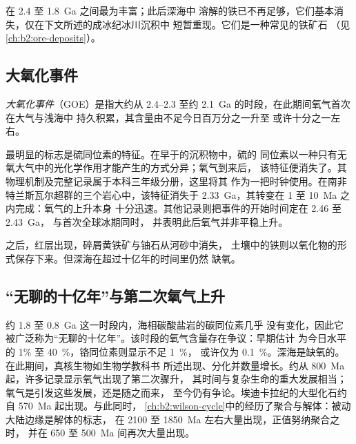 在 2.4 至 \qty{1.8}{Ga} 之间最为丰富；此后深海中
溶解的铁已不再足够，它们基本消失，仅在下文所述的成冰纪冰川沉积中
短暂重现。它们是一种常见的铁矿石
（见\cref{ch:b2:ore-deposits}）。

\subsection*{大氧化事件}

\begin{definition}[大氧化事件]\label{def:b2:precambrian-earth:goe}
\emph{大氧化事件}（GOE）是指大约从 2.4–2.3 至约
\qty{2.1}{Ga} 的时段，在此期间氧气首次在大气与浅海中
持久积累，其含量由不足今日百万分之一升至
或许十分之一左右。
\end{definition}

最明显的标志是硫同位素的特征。在早于的沉积物中，硫的
同位素以一种只有无氧大气中的光化学作用才能产生的方式分异；氧气到来后，
该特征便消失了。其物理机制及完整记录属于本科三年级分册，这里将其
作为一把时钟使用。在南非特兰斯瓦尔超群的三个岩心中，该特征消失于
\qty{2.33}{Ga}，其转变在 1 至 \qty{10}{Ma} 之内完成：氧气的上升本身
十分迅速。其他记录则把事件的开始时间定在 2.46 至 \qty{2.43}{Ga}，
与首次全球冰期同时，
并表明此后氧气并非平稳上升。

之后，红层出现，碎屑黄铁矿与铀石从河砂中消失，
土壤中的铁则以氧化物的形式保存下来。但深海在超过十亿年的时间里仍然
缺氧。

\subsection*{“无聊的十亿年”与第二次氧气上升}

约 1.8 至 \qty{0.8}{Ga} 这一时段内，海相碳酸盐岩的碳同位素几乎
没有变化，因此它被广泛称为“无聊的十亿年”。该时段的氧气含量存在争议：早期估计
为今日水平的 1\% 至 \qty{40}{\percent}，铬同位素则显示不足 \qty{1}{\percent}，
或许仅为 \qty{0.1}{\percent}。深海是缺氧的。在此期间，真核生物如生物学教科书
所述出现、分化并数量增长。约从 \qty{800}{Ma} 起，许多记录显示氧气出现了第二次骤升，
其时间与复杂生命的重大发展相当；氧气是引发这些发展，还是随之而来，
至今仍有争论。埃迪卡拉纪的大型化石约自 \qty{570}{Ma} 起出现。与此同时，
\cref{ch:b2:wilson-cycle}中的经历了聚合与解体：被动大陆边缘是解体的标志，
在 2100 至 \qty{1850}{Ma} 左右大量出现，正值努纳聚合之时，
并在 650 至 \qty{500}{Ma} 间再次大量出现。

